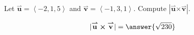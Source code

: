 \documentclass{ximera}
\author{Gregory Hartman \and Matthew Carr}
\begin{document}
\begin{exercise}
Let $\overset{\boldsymbol{\rightharpoonup}}{\mathbf{u}}= \left< -2,1,5 \right>$ and $\overset{\boldsymbol{\rightharpoonup}}{\mathbf{v}}= \left< -1,3,1\right>$. Compute $|\overset{\boldsymbol{\rightharpoonup}}{\mathbf{u}} \boldsymbol\times \overset{\boldsymbol{\rightharpoonup}}{\mathbf{v}}|$.

\begin{prompt}
\[
|\overset{\boldsymbol{\rightharpoonup}}{\mathbf{u}} \boldsymbol\times \overset{\boldsymbol{\rightharpoonup}}{\mathbf{v}}|=\answer{\sqrt{230}}
\]
\end{prompt}


\end{exercise}
\end{document}
